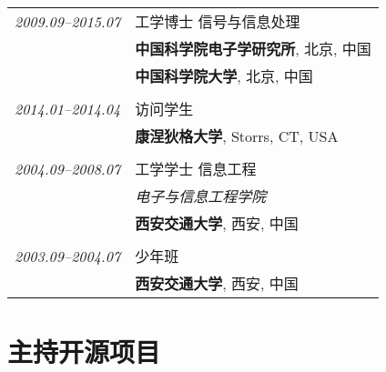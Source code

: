 \documentclass[paper=a4,fontsize=11pt]{scrartcl}
\begin{document}
\begin{tabular}{r|p{11cm}}	
	\emph{2009.09--2015.07} & 工学博士 \textsc{信号与信息处理} \\
	& \normalsize\textbf{中国科学院电子学研究所}, 北京, 中国\\
	& \normalsize\textbf{中国科学院大学}, 北京, 中国\\
	\multicolumn{2}{c}{} \\
	
	
	\emph{2014.01--2014.04} & 访问学生 \\
	& \normalsize\textbf{康涅狄格大学}, Storrs, CT, USA\\
	\multicolumn{2}{c}{} \\


	\emph{2004.09--2008.07} & 工学学士 \textsc{}\textsc{信息工程} \\
	& \small\emph{电子与信息工程学院}\\
	& \normalsize\textbf{西安交通大学}, 西安, 中国\\
	\multicolumn{2}{c}{} \\
	
	
	\emph{2003.09--2004.07} & \textsc{}\textsc{少年班} \\
	  & \normalsize\textbf{西安交通大学}, 西安, 中国




\end{tabular}

\section*{主持开源项目}
\end{document}
